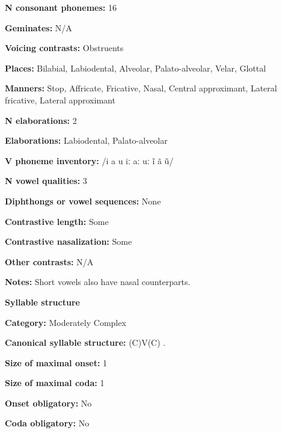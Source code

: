 \textbf{N consonant phonemes:} 16



\textbf{Geminates:} N/A



\textbf{Voicing contrasts:} Obstruents



\textbf{Places:} Bilabial, Labiodental, Alveolar, Palato-alveolar, Velar, Glottal



\textbf{Manners:} Stop, Affricate, Fricative, Nasal, Central approximant, Lateral fricative, Lateral approximant



\textbf{N elaborations:} 2



\textbf{Elaborations:} Labiodental, Palato-alveolar



\textbf{V phoneme inventory:} /i a u iː aː uː ĩ ã ũ/



\textbf{N vowel qualities:} 3



\textbf{Diphthongs or vowel sequences:} None



\textbf{Contrastive length:} Some



\textbf{Contrastive nasalization:} Some



\textbf{Other contrasts:} N/A



\textbf{Notes:} Short vowels also have nasal counterparts.



\textbf{Syllable structure}



\textbf{Category:} Moderately Complex



\textbf{Canonical syllable structure:} (C)V(C) \citep[18-21]{Broadwell2006}.



\textbf{Size of maximal onset:} 1



\textbf{Size of maximal coda:} 1



\textbf{Onset obligatory:} No



\textbf{Coda obligatory:} No



